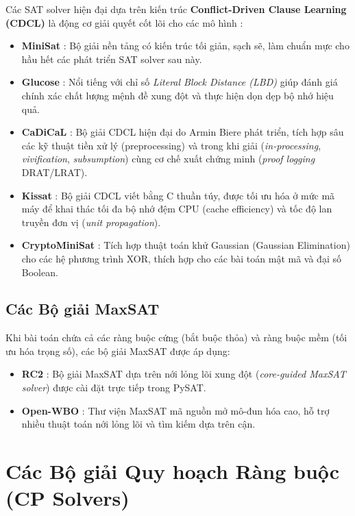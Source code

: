 Các SAT solver hiện đại dựa trên kiến trúc \textbf{Conflict-Driven Clause Learning (CDCL)} \parencite{marquessilva2009cdcl} là động cơ giải quyết cốt lõi cho các mô hình \CNF:
\begin{itemize}
  \item \textbf{MiniSat} \parencite{een2003minisat}: Bộ giải nền tảng có kiến trúc tối giản, sạch sẽ, làm chuẩn mực cho hầu hết các phát triển SAT solver sau này.
  \item \textbf{Glucose} \parencite{audemard2009lbd}: Nổi tiếng với chỉ số \emph{Literal Block Distance (LBD)} giúp đánh giá chính xác chất lượng mệnh đề xung đột và thực hiện dọn dẹp bộ nhớ hiệu quả.
  \item \textbf{CaDiCaL} \parencite{biere2019cadical}: Bộ giải CDCL hiện đại do Armin Biere phát triển, tích hợp sâu các kỹ thuật tiền xử lý (preprocessing) và trong khi giải (\emph{in-processing}, \emph{vivification}, \emph{subsumption}) cùng cơ chế xuất chứng minh \UNSAT (\emph{proof logging} DRAT/LRAT).
  \item \textbf{Kissat} \parencite{biere2019cadical}: Bộ giải CDCL viết bằng C thuần túy, được tối ưu hóa ở mức mã máy để khai thác tối đa bộ nhớ đệm CPU (cache efficiency) và tốc độ lan truyền đơn vị (\emph{unit propagation}).
  \item \textbf{CryptoMiniSat} \parencite{soos2009cryptominisat}: Tích hợp thuật toán khử Gaussian (Gaussian Elimination) cho các hệ phương trình XOR, thích hợp cho các bài toán mật mã và đại số Boolean.
\end{itemize}

\subsection{Các Bộ giải MaxSAT}

Khi bài toán chứa cả các ràng buộc cứng (bắt buộc thỏa) và ràng buộc mềm (tối ưu hóa trọng số), các bộ giải MaxSAT được áp dụng:
\begin{itemize}
  \item \textbf{RC2} \parencite{ignatiev2018pysat}: Bộ giải MaxSAT dựa trên nới lỏng lõi xung đột (\emph{core-guided MaxSAT solver}) được cài đặt trực tiếp trong PySAT.
  \item \textbf{Open-WBO} \parencite{martins2014openwbo}: Thư viện MaxSAT mã nguồn mở mô-đun hóa cao, hỗ trợ nhiều thuật toán nới lỏng lõi và tìm kiếm dựa trên cận.
\end{itemize}

\section{Các Bộ giải Quy hoạch Ràng buộc (CP Solvers)}

